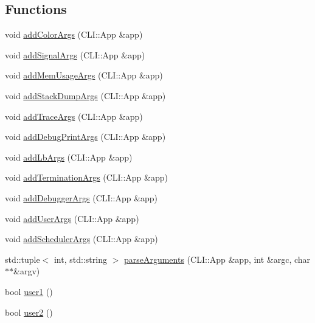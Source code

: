 \subsection*{Functions}
\begin{DoxyCompactItemize}
\item 
void \hyperlink{namespacevt_1_1arguments_ad20ec30a52a3746760ec7ce8eaaf9af4}{add\+Color\+Args} (C\+L\+I\+::\+App \&app)
\item 
void \hyperlink{namespacevt_1_1arguments_a61af811ee1284bef96edef93a52792c4}{add\+Signal\+Args} (C\+L\+I\+::\+App \&app)
\item 
void \hyperlink{namespacevt_1_1arguments_aaca43f74b5683e17a530a2227702f9e4}{add\+Mem\+Usage\+Args} (C\+L\+I\+::\+App \&app)
\item 
void \hyperlink{namespacevt_1_1arguments_a98bea139ecaff54e0b2b03afeba5a6a1}{add\+Stack\+Dump\+Args} (C\+L\+I\+::\+App \&app)
\item 
void \hyperlink{namespacevt_1_1arguments_a31bf3855abd5a792cb6c784858ef8b6c}{add\+Trace\+Args} (C\+L\+I\+::\+App \&app)
\item 
void \hyperlink{namespacevt_1_1arguments_aed7df943038a6c703af79f7bf81b0fdd}{add\+Debug\+Print\+Args} (C\+L\+I\+::\+App \&app)
\item 
void \hyperlink{namespacevt_1_1arguments_a6aad4b5d38f16351c068abfc268d5410}{add\+Lb\+Args} (C\+L\+I\+::\+App \&app)
\item 
void \hyperlink{namespacevt_1_1arguments_a700d5e06c85a85f40a3f8c36f62dddb6}{add\+Termination\+Args} (C\+L\+I\+::\+App \&app)
\item 
void \hyperlink{namespacevt_1_1arguments_a0ac7bcdb2013e7b486c1f6e052cd8731}{add\+Debugger\+Args} (C\+L\+I\+::\+App \&app)
\item 
void \hyperlink{namespacevt_1_1arguments_a1c50652e9209a72449953853975d4817}{add\+User\+Args} (C\+L\+I\+::\+App \&app)
\item 
void \hyperlink{namespacevt_1_1arguments_a586a9f239bd236bf2bc6ec02b1290fcc}{add\+Scheduler\+Args} (C\+L\+I\+::\+App \&app)
\item 
std\+::tuple$<$ int, std\+::string $>$ \hyperlink{namespacevt_1_1arguments_a39c463c5d2743546d1035d9654f9da77}{parse\+Arguments} (C\+L\+I\+::\+App \&app, int \&argc, char $\ast$$\ast$\&argv)
\item 
bool \hyperlink{namespacevt_1_1arguments_afe229ddf0b473e54fac5ff6884b07ad0}{user1} ()
\item 
bool \hyperlink{namespacevt_1_1arguments_ae58fe1d056c863f7d8103e9c240d17f2}{user2} ()
$$
\end{DoxyCompactItemize}
